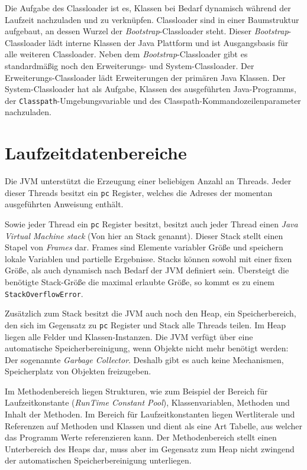 Die Aufgabe des Classloader ist es, Klassen bei Bedarf dynamisch während der Laufzeit nachzuladen und zu verknüpfen. Classloader sind in einer Baumstruktur aufgebaut, an dessen Wurzel der \textit{Bootstrap}-Classloader steht. Dieser \textit{Bootstrap}-Classloader lädt interne Klassen der Java Plattform und ist Ausgangsbasis für alle weiteren Classloader. Neben dem \textit{Bootstrap}-Classloader gibt es standardmäßig noch den Erweiterungs- und System-Classloader. Der Erweiterungs-Classloader lädt Erweiterungen der primären Java Klassen. Der System-Classloader hat als Aufgabe, Klassen des ausgeführten Java-Programms, der \texttt{Classpath}-Umgebungsvariable und des Classpath-Kommandozeilenparameter nachzuladen.

\section{Laufzeitdatenbereiche}

Die JVM unterstützt die Erzeugung einer beliebigen Anzahl an Threads. Jeder dieser Threads besitzt ein \texttt{pc} Register, welches die Adreses der momentan ausgeführten Anweisung enthält.

Sowie jeder Thread ein \texttt{pc} Register besitzt, besitzt auch jeder Thread einen \textit{Java Virtual Machine stack} (Von hier an Stack genannt). Dieser Stack stellt einen Stapel von \textit{Frames} dar. Frames sind Elemente variabler Größe und speichern lokale Variablen und partielle Ergebnisse. Stacks können sowohl mit einer fixen Größe, als auch dynamisch nach Bedarf der JVM definiert sein. Übersteigt die benötigte Stack-Größe die maximal erlaubte Größe, so kommt es zu einem \texttt{StackOverflowError}.

Zusätzlich zum Stack besitzt die JVM auch noch den Heap, ein Speicherbereich, den sich im Gegensatz zu \texttt{pc} Register und Stack alle Threads teilen. Im Heap liegen alle Felder und Klassen-Instanzen. Die JVM verfügt über eine automatische Speicherbereinigung, wenn Objekte nicht mehr benötigt werden: Der sogenannte \textit{Garbage Collector}. Deshalb gibt es auch keine Mechanismen, Speicherplatz von Objekten freizugeben.

Im Methodenbereich liegen Strukturen, wie zum Beispiel der Bereich für Laufzeitkonstante (\textit{Run\-Time Constant Pool}), Klassenvariablen, Methoden und Inhalt der Methoden. Im Bereich für Laufzeitkonstanten liegen Wertliterale und Referenzen auf Methoden und Klassen und dient als eine Art Tabelle, aus welcher das Programm Werte referenzieren kann.  Der Methodenbereich stellt einen Unterbereich des Heaps dar, muss aber im Gegensatz zum Heap nicht zwingend der automatischen Speicherbereinigung unterliegen.

